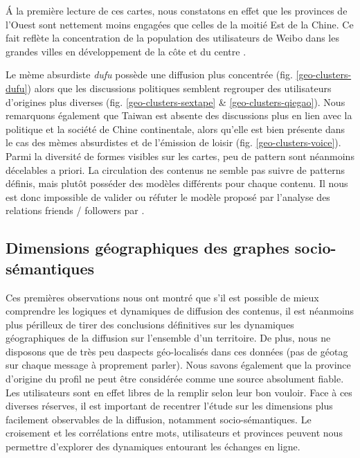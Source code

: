 \'A la première lecture de ces cartes, nous constatons en effet que les provinces de l{\textquoteright}Ouest sont nettement moins engagées que celles de la moitié Est de la Chine. Ce fait reflète la concentration de la population des utilisateurs de Weibo dans les grandes villes en développement de la c\^ote et du centre \citep{Fu2013}. 

Le mème absurdiste \textit{dufu} possède une diffusion plus concentrée (fig. \ref{geo-clusters-dufu}) alors que les discussions politiques semblent regrouper des utilisateurs d{\textquoteright}origines plus diverses (fig. \ref{geo-clusters-sextape} \& \ref{geo-clusters-qiegao}). Nous remarquons également que Taiwan est absente des discussions plus en lien avec la politique et la société de Chine continentale, alors qu{\textquoteright}elle est bien présente dans le cas des mèmes absurdistes et de l{\textquoteright}émission de loisir (fig. \ref{geo-clusters-voice}). Parmi la diversité de formes visibles sur les cartes, peu de pattern sont néanmoins décelables a priori. La circulation des contenus ne semble pas suivre de patterns définis, mais plutôt posséder des modèles différents pour chaque contenu. Il nous est donc impossible de valider ou réfuter le modèle proposé par l'analyse des relations friends / followers par \cite{Zhen2013}. 

\subsection{Dimensions géographiques des graphes socio-sémantiques}

Ces premières observations nous ont montré que s{\textquoteright}il est possible de mieux comprendre les logiques et dynamiques de diffusion des contenus, il est néanmoins plus périlleux de tirer des conclusions définitives sur les dynamiques géographiques de la diffusion sur l{\textquoteright}ensemble d{\textquoteright}un territoire. De plus, nous ne disposons que de très peu d{\textquotesingle}aspects {\textquotedbl}géo-localisés{\textquotedbl} dans ces données (pas de géotag sur chaque message \`a proprement parler). Nous savons également que la province d{\textquoteright}origine du profil ne peut être considérée comme une source absolument fiable. Les utilisateurs sont en effet libres de la remplir selon leur bon vouloir. Face \`a ces diverses réserves, il est important de recentrer l{\textquoteright}étude sur les dimensions plus facilement observables de la diffusion, notamment socio-sémantiques. Le croisement et les corrélations entre mots, utilisateurs et provinces peuvent nous permettre d'explorer des dynamiques entourant les échanges en ligne.

